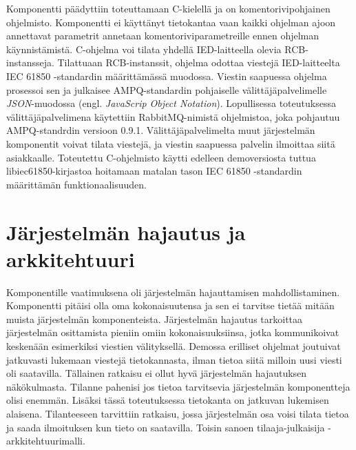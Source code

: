 Komponentti päädyttiin toteuttamaan C-kielellä ja on komentorivipohjainen ohjelmisto. Komponentti ei käyttänyt tietokantaa vaan kaikki ohjelman ajoon annettavat parametrit annetaan komentoriviparametreille ennen ohjelman käynnistämistä. C-ohjelma voi tilata yhdellä IED-laitteella olevia RCB-instansseja. Tilattuaan RCB-instanssit, ohjelma odottaa viestejä IED-laitteelta IEC 61850 -standardin määrittämässä muodossa. Viestin saapuessa ohjelma prosessoi sen ja julkaisee AMPQ-standardin pohjaiselle välittäjäpalvelimelle \emph{JSON}-muodossa (engl. \emph{JavaScrip Object Notation}). Lopullisessa toteutuksessa välittäjäpalvelimena käytettiin RabbitMQ-nimistä ohjelmistoa, joka pohjautuu AMPQ-standrdin versioon 0.9.1. Välittäjäpalvelimelta muut järjestelmän komponentit voivat tilata viestejä, ja viestin saapuessa palvelin ilmoittaa siitä asiakkaalle. Toteutettu C-ohjelmisto käytti edelleen demoversiosta tuttua libiec61850-kirjastoa hoitamaan matalan tason IEC 61850 -standardin määrittämän funktionaalisuuden.


\section{Järjestelmän hajautus ja arkkitehtuuri}
\label{ch:järjestelmän-hajautus-ja-arkkitehtuuri}

Komponentille vaatimuksena oli järjestelmän hajauttamisen mahdollistaminen. Komponentti pitäisi olla oma kokonaisuutensa ja sen ei tarvitse tietää mitään muista järjestelmän komponenteista.  Järjestelmän hajautus tarkoittaa järjestelmän osittamista pieniin omiin kokonaisuuksiinsa, jotka kommunikoivat keskenään esimerkiksi viestien välityksellä. Demossa erilliset ohjelmat joutuivat jatkuvasti lukemaan viestejä tietokannasta, ilman tietoa siitä milloin uusi viesti oli saatavilla. Tällainen ratkaisu ei ollut hyvä järjestelmän hajautuksen näkökulmasta. Tilanne pahenisi jos tietoa tarvitsevia järjestelmän komponentteja olisi enemmän. Lisäksi tässä toteutuksessa tietokanta on jatkuvan lukemisen alaisena. Tilanteeseen tarvittiin ratkaisu, jossa järjestelmän osa voisi tilata tietoa ja saada ilmoituksen kun tieto on saatavilla. Toisin sanoen tilaaja-julkaisija -arkkitehtuurimalli.

